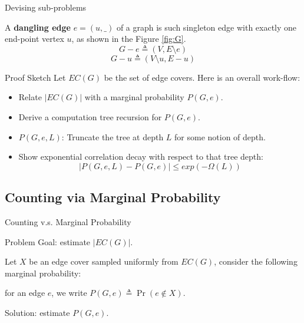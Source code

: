 \documentclass[mathserif]{beamer}
\newcommand{\abs}[1]{\left\vert#1\right\vert}
\begin{document}
\begin{frame}{Devising sub-problems} %

\begin{definition}
	A {\bf dangling edge} $e=(u,\_)$ of a graph is such singleton edge with exactly one end-point vertex $u$, as shown in the Figure \ref{fig:G}.
\[ G - e \triangleq \left(V, E \setminus e\right) \]
\[ G - u \triangleq \left(V \setminus u, E - u\right) \]
\end{definition}

\end{frame}

\begin{frame}{Proof Sketch}
Let $EC(G)$ be the set of edge covers.
Here is an overall work-flow:
\begin{itemize}
  \item \alert{Relate $\abs{EC(G)}$ with a marginal probability $P(G,e)$.}
  \item Derive a computation tree recursion for $P(G,e)$.
  \item $P(G,e,L)$: Truncate the tree at depth $L$ for some notion of depth.
  \item{ Show exponential correlation decay with respect to that tree depth:
  \[
    \abs{ P(G,e,L) - P(G,e) } \leq exp(-\Omega(L))
  \]}
\end{itemize}

\end{frame}

\subsection{Counting via Marginal Probability}
\begin{frame}{Counting v.s. Marginal Probability}
	\begin{block}{Problem}
	Goal: estimate $\abs{EC(G)}$.
	\end{block}
	
	Let $X$ be an edge cover sampled uniformly from $EC(G)$, consider the following marginal probability:

	for an edge $e$, we write $P(G,e) \triangleq \Pr ( e \notin X)$.

	\bigskip

	Solution: estimate $P(G,e)$.
\end{frame}
\end{document}
